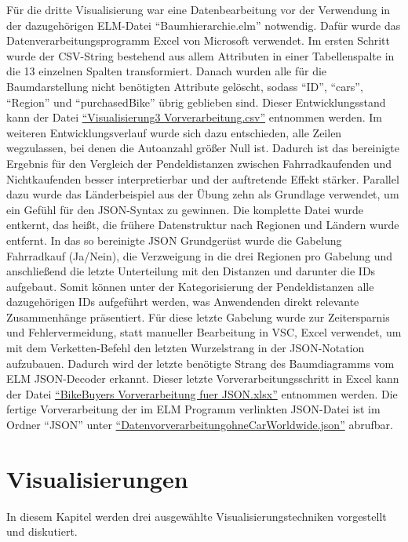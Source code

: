 \documentclass[usegeometry=true]{scrartcl}
\begin{document}
Für die dritte Visualisierung war eine Datenbearbeitung vor der Verwendung in der dazugehörigen ELM-Datei "`Baumhierarchie.elm"' notwendig.
Dafür wurde das Datenverarbeitungsprogramm Excel von Microsoft verwendet. 
Im ersten Schritt wurde der CSV-String bestehend aus allem Attributen in einer Tabellenspalte in die 13 einzelnen Spalten transformiert. Danach wurden alle für die Baumdarstellung nicht benötigten Attribute gelöscht, sodass "`ID"', "`cars"', "`Region"' und "`purchasedBike"' übrig geblieben sind. Dieser Entwicklungsstand kann der Datei \href{https://github.com/floeagle/Bike-Buyers-1000/blob/main/Daten-zum-Laden/Datenvorverarbeitung/Visualisierung3_Vorverarbeitung.csv}{"`Visualisierung3 Vorverarbeitung.csv"'} entnommen werden. Im weiteren Entwicklungsverlauf wurde sich dazu entschieden, alle Zeilen  wegzulassen, bei denen die Autoanzahl größer Null ist. Dadurch ist das bereinigte Ergebnis für den Vergleich der Pendeldistanzen zwischen Fahrradkaufenden und Nichtkaufenden besser interpretierbar und der auftretende Effekt stärker. 
Parallel dazu wurde das Länderbeispiel aus der Übung zehn als Grundlage verwendet, um ein Gefühl für den JSON-Syntax zu gewinnen. Die komplette Datei wurde entkernt, das heißt, die frühere Datenstruktur nach Regionen und  Ländern wurde entfernt. In das so bereinigte JSON Grundgerüst wurde die Gabelung Fahrradkauf (Ja/Nein), die  Verzweigung in die drei Regionen pro Gabelung und anschließend die letzte Unterteilung mit den Distanzen und darunter die IDs aufgebaut. Somit können unter der Kategorisierung der Pendeldistanzen alle dazugehörigen IDs aufgeführt werden, was Anwendenden direkt relevante Zusammenhänge präsentiert. Für diese letzte Gabelung wurde zur Zeitersparnis und Fehlervermeidung, statt manueller Bearbeitung in VSC, Excel verwendet, um mit dem Verketten-Befehl den letzten Wurzelstrang in der JSON-Notation aufzubauen. Dadurch wird der letzte benötigte Strang des Baumdiagramms vom ELM JSON-Decoder erkannt. Dieser letzte Vorverarbeitungsschritt in Excel kann der Datei \href{https://github.com/floeagle/Bike-Buyers-1000/blob/main/Daten-zum-Laden/Datenvorverarbeitung/BikeBuyers_Vorverarbeitung-fuer-JSON.xlsx}{"`BikeBuyers Vorverarbeitung fuer JSON.xlsx"'} entnommen werden.
Die fertige Vorverarbeitung der im ELM Programm verlinkten JSON-Datei ist im Ordner "`JSON"' unter \href{https://github.com/floeagle/Bike-Buyers-1000/blob/main/Daten-zum-Laden/Datenvorverarbeitung/JSON/DatenvorverarbeitungohneCarWorldwide.json}{"`DatenvorverarbeitungohneCarWorldwide.json"'} abrufbar.

\section{Visualisierungen}
In diesem Kapitel werden drei ausgewählte Visualisierungstechniken vorgestellt und diskutiert.
\end{document}
